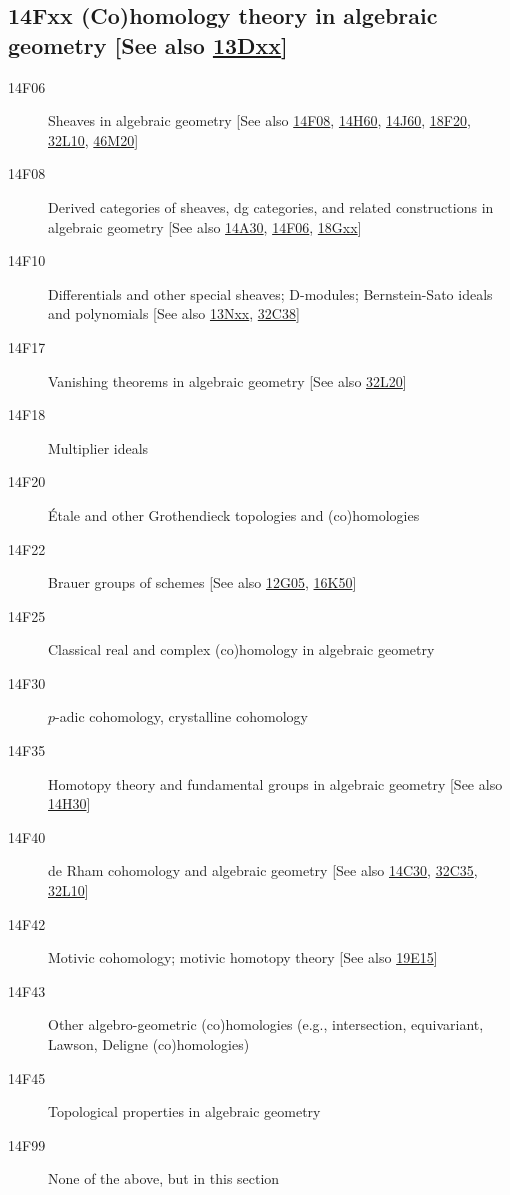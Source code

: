 \subsection*{14Fxx  (Co)homology theory in algebraic geometry [See also \hyperref[13Dxx]{13Dxx}] }\label{14Fxx}
\begin{description}     
\item [14F06]\label{14F06} Sheaves in algebraic geometry [See also \hyperref[14F08]{14F08}, \hyperref[14H60]{14H60}, \hyperref[14J60]{14J60}, \hyperref[18F20]{18F20}, \hyperref[32L10]{32L10}, \hyperref[46M20]{46M20}]
\item [14F08]\label{14F08} Derived categories of sheaves, dg categories, and related constructions in algebraic geometry [See also \hyperref[14A30]{14A30}, \hyperref[14F06]{14F06}, \hyperref[18Gxx]{18Gxx}]
\item [14F10]\label{14F10} Differentials and other special sheaves; D-modules; Bernstein-Sato ideals and polynomials [See also \hyperref[13Nxx]{13Nxx}, \hyperref[32C38]{32C38}]
\item [14F17]\label{14F17} Vanishing theorems in algebraic geometry [See also \hyperref[32L20]{32L20}]
\item [14F18]\label{14F18} Multiplier ideals
\item [14F20]\label{14F20} \'{E}tale and other Grothendieck topologies and (co)homologies
\item [14F22]\label{14F22} Brauer groups of schemes [See also \hyperref[12G05]{12G05}, \hyperref[16K50]{16K50}]
\item [14F25]\label{14F25} Classical real and complex (co)homology in algebraic geometry
\item [14F30]\label{14F30} $p$-adic cohomology, crystalline cohomology
\item [14F35]\label{14F35} Homotopy theory and fundamental groups in algebraic geometry [See also \hyperref[14H30]{14H30}]
\item [14F40]\label{14F40} de Rham cohomology and algebraic geometry [See also \hyperref[14C30]{14C30}, \hyperref[32C35]{32C35}, \hyperref[32L10]{32L10}]
\item [14F42]\label{14F42} Motivic cohomology; motivic homotopy theory [See also \hyperref[19E15]{19E15}]
\item [14F43]\label{14F43} Other algebro-geometric (co)homologies (e.g., intersection, equivariant, Lawson, Deligne (co)homologies)
\item [14F45]\label{14F45} Topological properties in algebraic geometry
\item [14F99]\label{14F99} None of the above, but in this section
\end{description}          
